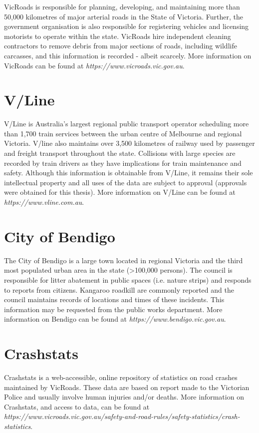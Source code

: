 VicRoads is responsible for planning, developing, and maintaining more than 50,000 kilometres of major arterial roads in the State of Victoria. Further, the government organisation is also responsible for registering vehicles and licensing motorists to operate within the state. VicRoads hire independent cleaning contractors to remove debris from major sections of roads, including wildlife carcasses, and this information is recorded - albeit scarcely. More information on VicRoads can be found at \textit{https://www.vicroads.vic.gov.au}.

\section{V/Line}

V/Line is Australia's largest regional public transport operator scheduling more than 1,700 train services between the urban centre of Melbourne and regional Victoria. V/line also maintains over 3,500 kilometres of railway used by passenger and freight transport throughout the state. Collisions with large species are recorded by train drivers as they have implications for train maintenance and safety. Although this information is obtainable from V/Line, it remains their sole intellectual property and all uses of the data are subject to approval (approvals were obtained for this thesis). More information on V/Line can be found at \textit{https://www.vline.com.au}.

\section{City of Bendigo}

The City of Bendigo is a large town located in regional Victoria and the third most populated urban area in the state (>100,000 persons). The council is responsible for litter abatement in public spaces (i.e. nature strips) and responds to reports from citizens. Kangaroo roadkill are commonly reported and the council maintains records of locations and times of these incidents. This information may be requested from the public works department. More information on Bendigo can be found at \textit{https://www.bendigo.vic.gov.au}.

\section{Crashstats}

Crashstats is a web-accessible, online repository of statistics on road crashes maintained by VicRoads. These data are based on report made to the Victorian Police and usually involve human injuries and/or deaths. More information on Crashstats, and access to data, can be found at \textit{https://www.vicroads.vic.gov.au/safety-and-road-rules/safety-statistics/crash-statistics}.

